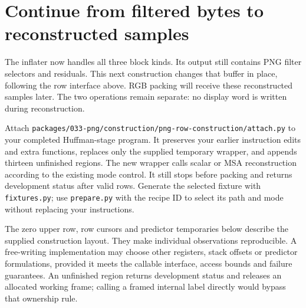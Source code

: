 \section{Continue from filtered bytes to reconstructed samples}
The inflater now handles all three block kinds. Its output still contains PNG filter
selectors and residuals. This next construction changes that buffer in place, following
the row interface above. RGB packing will receive these reconstructed samples later.
The two operations remain separate: no display word is written during reconstruction.

Attach \texttt{packages/033-png/construction/png-row-construction/attach.py} to your completed Huffman-stage
program. It preserves your earlier instruction edits and extra functions, replaces
only the supplied temporary wrapper, and appends thirteen unfinished regions. The
new wrapper calls scalar or MSA reconstruction according to the existing mode control.
It still stops before packing and returns development status after valid rows.
Generate the selected fixture with \texttt{fixtures.py}; use \texttt{prepare.py} with
the recipe ID to select its path and mode without replacing your instructions.

The zero upper row, row cursors and predictor temporaries below describe the supplied
construction layout. They make individual observations reproducible. A free-writing
implementation may choose other registers, stack offsets or predictor formulations,
provided it meets the callable interface, access bounds and failure guarantees.
An unfinished region returns development status and releases an allocated working
frame; calling a framed internal label directly would bypass that ownership rule.
